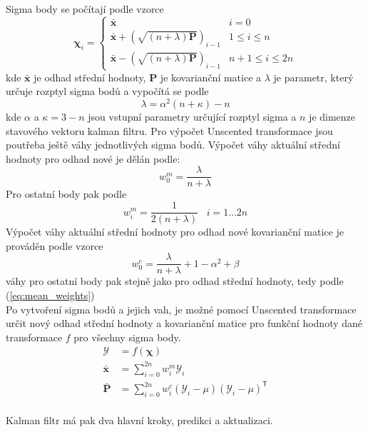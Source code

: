 \documentclass[a4paper,12pt]{article}
\begin{document}
Sigma body se počítají podle vzorce
\begin{equation}
    \boldsymbol{\chi}_{i} = \begin{cases}
        \mathbf{\bar{x}} & i = 0 \\
        \mathbf{\bar{x}} + (\sqrt{(n + \lambda) \mathbf P})_{i-1} & 1 \leq i \leq n \\
        \mathbf{\bar{x}} - (\sqrt{(n + \lambda) \mathbf P})_{i-1} & n + 1 \leq i \leq 2n
    \end{cases}
\end{equation}
kde $\mathbf{\bar{x}}$ je odhad střední hodnoty, $\mathbf P$ je kovarianční matice a $\lambda$ je parametr, který určuje rozptyl sigma bodů a vypočítá se podle
\begin{equation}
    \lambda = \alpha^2(n + \kappa) - n
\end{equation}
kde $\alpha$ a $\kappa = 3 - n$ jsou vstupní parametry určující rozptyl sigma a $n$ je dimenze stavového vektoru kalman filtru. 
Pro výpočet Unscented transformace jsou poutřeba ještě váhy jednotlivých sigma bodů. 
Výpočet váhy aktuální střední hodnoty pro odhad nové je dělán podle: 
\begin{equation}
    w^{m}_0 = \frac{\lambda}{n + \lambda}
\end{equation}
Pro ostatní body pak podle 
\begin{equation}
    w^m_i = \frac{1}{2(n+\lambda)} \;\;\; i = 1...2n
    \label{eq:mean_weights}
\end{equation}
Výpočet váhy aktuální střední hodnoty pro odhad nové kovarianční matice je prováděn podle vzorce
\begin{equation}
   w^c_0 = \frac{\lambda}{n + \lambda} + 1 - \alpha^2 + \beta
\end{equation}
váhy pro ostatní body pak stejně jako pro odhad střední hodnoty, tedy podle (\ref{eq:mean_weights})
\\
Po vytvoření sigma bodů a jejich vah, je možné pomocí Unscented transformace určit nový odhad střední hodnoty a kovarianční matice pro funkční hodnoty dané transformace $f$ pro všechny sigma body.
\begin{equation}
    \begin{aligned}
    \boldsymbol{\mathcal{Y}} &= f(\boldsymbol{\chi}) \\
    \mathbf{\bar{x}} &= \sum_{i=0}^{2n} w^m_i\boldsymbol{\mathcal{Y}}_i \\
    \mathbf{\bar{P}} &= \sum_{i=0}^{2n} w^c_i{(\boldsymbol{\mathcal{Y}}_i-\mu)(\boldsymbol{\mathcal{Y}}_i-\mu)^\mathsf{T}}
    \end{aligned}
    \label{eq:ukf_transform}
\end{equation}
\\
Kalman filtr má pak dva hlavní kroky, predikci a aktualizaci.\\
\end{document}
